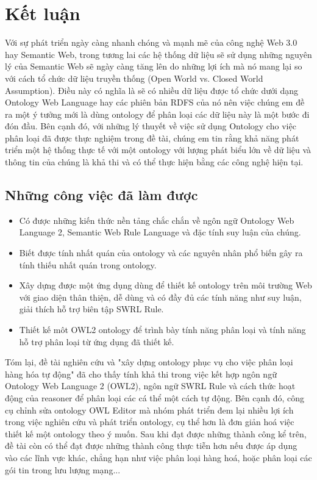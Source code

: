\chapter{Kết luận}
Với sự phát triển ngày càng nhanh chóng và mạnh mẽ của công nghệ Web 3.0 hay Semantic Web, trong tương lai các hệ thống dữ liệu sẽ sử dụng những nguyên lý của Semantic Web sẽ ngày càng tăng lên do những lợi ích mà nó mang lại so với cách tổ chức dữ liệu truyền thống (Open World vs. Closed World Assumption). Điều này có nghĩa là sẽ có nhiều dữ liệu được tổ chức dưới dạng Ontology Web Language hay các phiên bản RDFS của nó nên việc chúng em đề ra một ý tưởng mới là dùng ontology để phân loại các dữ liệu này là một bước đi đón đầu. Bên cạnh đó, với những lý thuyết về việc sử dụng Ontology cho việc phân loại đã được thực nghiệm trong đề tài, chúng em tin rằng khả năng phát triển một hệ thống thực tế với một ontology với lượng phát biểu lớn về dữ liệu và thông tin của chúng là khả thi và có thể thực hiện bằng các công nghệ hiện tại.
\section{Những công việc đã làm được}
\begin{itemize}
\item Có được những kiến thức nền tảng chắc chắn về ngôn ngữ Ontology Web Language 2, Semantic Web Rule Language và đặc tính suy luận của chúng.
\item Biết được tính nhất quán của ontology  và các nguyên nhân phổ biến gây ra tính thiếu nhất quán trong ontology.
\item Xây dựng được một ứng dụng dùng để thiết kế ontology trên môi trường Web với giao diện thân thiện, dễ dùng và có đầy đủ các tính năng như suy luận, giải thích hỗ trợ biên tập SWRL Rule.
\item Thiết kế môt OWL2 ontology để trình bày tính năng phân loại và tính năng hỗ trợ phân loại từ ứng dụng đã thiết kế.
\end{itemize}
Tóm lại, đề tài nghiên cứu và "xây dựng ontology phục vụ cho việc phân loại hàng hóa tự động" đã cho thấy tính khả thi trong việc kết hợp ngôn ngữ Ontology Web Language 2 (OWL2), ngôn ngữ SWRL Rule và cách thức hoạt động của reasoner để phân loại các cá thể một cách tự động. Bên cạnh đó, công cụ chỉnh sửa ontology OWL Editor mà nhóm phát triển đem lại nhiều lợi ích trong việc nghiên cứu và phát triển ontology, cụ thể hơn là đơn giản hoá việc thiết kế một ontology theo ý muốn. Sau khi đạt được những thành công kể trên, đề tài còn có thể đạt được những thành công thực tiễn hơn nếu được áp dụng vào các lĩnh vực khác, chẳng hạn như việc phân loại hàng hoá, hoặc phân loại các gói tin trong lưu lượng mạng...
